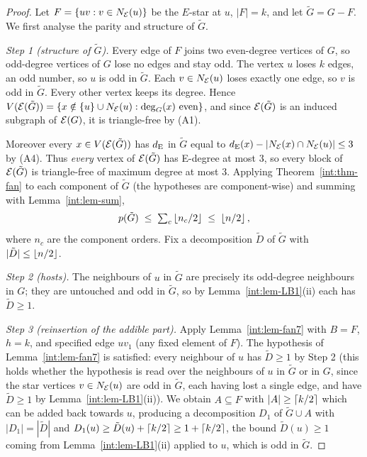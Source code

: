 \begin{proof}
Let $F=\{uv : v\in N_{\mathcal{E}}(u)\}$ be the $E$-star at $u$, $|F|=k$, and let
$\tilde G=G-F$. We first analyse the parity and structure of $\tilde G$.

\emph{Step 1 (structure of $\tilde G$).}
Every edge of $F$ joins two even-degree vertices of $G$, so odd-degree
vertices of $G$ lose no edges and stay odd. The vertex $u$ loses $k$ edges,
an odd number, so $u$ is odd in $\tilde G$. Each $v\in N_{\mathcal{E}}(u)$ loses
exactly one edge, so $v$ is odd in $\tilde G$. Every other vertex keeps its
degree. Hence
$V(\mathcal{E}(\tilde G))=\{x\notin\{u\}\cup N_{\mathcal{E}}(u) : \deg_G(x)\text{ even}\}$,
and since $\mathcal{E}(\tilde G)$ is an induced subgraph of $\mathcal{E}(G)$, it is
triangle-free by (A1).

Moreover every $x\in V(\mathcal{E}(\tilde G))$ has $d_{\mathrm{E}}$ in $\tilde G$ equal to
$d_{\mathrm{E}}(x)-|N_{\mathcal{E}}(x)\cap N_{\mathcal{E}}(u)|\le 3$ by (A4). Thus \emph{every}
vertex of $\mathcal{E}(\tilde G)$ has E-degree at most $3$, so every block of
$\mathcal{E}(\tilde G)$ is triangle-free of maximum degree at most $3$. Applying
Theorem~\ref{int:thm-fan} to each component of $\tilde G$ (the hypotheses are
component-wise) and summing with Lemma~\ref{int:lem-sum},
\begin{equation}\label{eq:clatildebound}
p(\tilde G)\;\le\;\textstyle\sum_c \left\lfloor n_c/2 \right\rfloor\;\le\;\left\lfloor n/2 \right\rfloor,
\end{equation}
where $n_c$ are the component orders. Fix a decomposition $\tilde D$ of
$\tilde G$ with $|\tilde D|\le\left\lfloor n/2 \right\rfloor$.

\emph{Step 2 (hosts).}
The neighbours of $u$ in $\tilde G$ are precisely its odd-degree neighbours
in $G$; they are untouched and odd in $\tilde G$, so by
Lemma~\ref{int:lem-LB1}(ii) each has $\tilde D\ge 1$.

\emph{Step 3 (reinsertion of the addible part).}
Apply Lemma~\ref{int:lem-fan7} with $B=F$, $h=k$, and specified edge $uv_1$
(any fixed element of $F$). The hypothesis of Lemma~\ref{int:lem-fan7} is
satisfied: every neighbour of $u$ has $\tilde D\ge 1$ by Step 2 (this
holds whether the hypothesis is read over the neighbours of $u$ in
$\tilde G$ or in $G$, since the star vertices $v\in N_{\mathcal{E}}(u)$ are odd in
$\tilde G$, each having lost a single edge, and have $\tilde D\ge 1$ by
Lemma~\ref{int:lem-LB1}(ii)). We obtain $A\subseteq F$ with $|A|\ge\left\lceil k/2 \right\rceil$
which can be added back towards $u$, producing a decomposition $D_1$ of
$\tilde G\cup A$ with $|D_1|=|\tilde D|$ and
$D_1(u)\ge \tilde D(u)+\left\lceil k/2 \right\rceil\ge 1+\left\lceil k/2 \right\rceil$, the bound
$\tilde D(u)\ge1$ coming from Lemma~\ref{int:lem-LB1}(ii) applied to $u$,
which is odd in $\tilde G$.


\end{proof}
